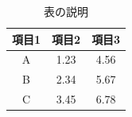 
\begin{table}[htbp]
  \centering
  \caption{表の説明}
  \label{tab:example}
  \begin{tabular}{ccc}
    \toprule
    項目1 & 項目2 & 項目3 \\
    \midrule
    A & 1.23 & 4.56 \\
    B & 2.34 & 5.67 \\
    C & 3.45 & 6.78 \\
    \bottomrule
  \end{tabular}
\end{table}
